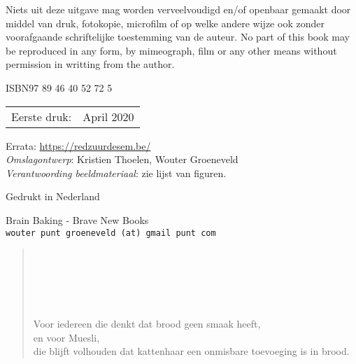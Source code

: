 Niets uit deze uitgave mag worden verveelvoudigd en/of openbaar gemaakt door middel van druk, fotokopie, microfilm of op welke andere wijze ook zonder voorafgaande schriftelijke toestemming van de auteur. \newline
No part of this book may be reproduced in any form, by mimeograph, film or any other means without permission in writting from the author. 

\begin{center}
 ISBN\hspace{2em}97 89 46 40 52 72 5
\end{center}

\begin{center}
\begin{tabular}{ll}
Eerste druk:  & April 2020 \\
\end{tabular}
\end{center}

\vfill

Errata: \url{https://redzuurdesem.be/} \\

\hspace*{2em} \textit{Omslagontwerp}: Kristien Thoelen, Wouter Groeneveld \\
\hspace*{2em} \textit{Verantwoording beeldmateriaal}: zie lijst van figuren. \\

\vfill

Gedrukt in Nederland

Brain Baking - Brave New Books \\
\texttt{wouter punt groeneveld (at) gmail punt com}

\vspace*{2\baselineskip}
\clearpage


 \newenvironment{dedication}
     {\vspace{6ex}\begin{quotation}\begin{center}\begin{em}}
     {\par\end{em}\end{center}\end{quotation}}

\begin{dedication}
  ~\\
  ~\\
  ~\\
  ~\\
  ~\\
	Voor iedereen die denkt dat brood geen smaak heeft, \\
	en voor Muesli, \\
  die blijft volhouden dat kattenhaar een onmisbare toevoeging is in brood. 
\end{dedication}

\endgroup
\clearpage


\pagestyle{empty}

\renewcommand*\contentsname{Inhoudsopgave}
{
  \setcounter{tocdepth}{2}
  \tableofcontents*
}

\clearpage
\pagestyle{desem}

